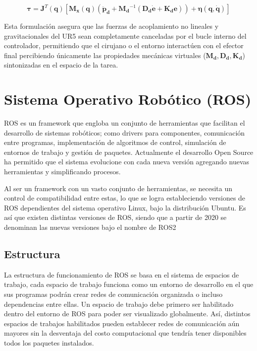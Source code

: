 \begin{equation}
    \boldsymbol{\tau} = \boldsymbol{J}^T(\boldsymbol{q}) \left[ \boldsymbol{M_x}(\boldsymbol{q}) \left( \boldsymbol{\ddot{p}_d} + \boldsymbol{M_d}^{-1} (\boldsymbol{D_d} \boldsymbol{\dot{e}} + \boldsymbol{K_d}
    \boldsymbol{e}) \right) + \boldsymbol{\eta}(\boldsymbol{q}, \boldsymbol{\dot{q}}) \right]
\end{equation}

Esta formulación asegura que las fuerzas de acoplamiento no lineales y
gravitacionales del UR5 sean completamente canceladas por el bucle interno del
controlador, permitiendo que el cirujano o el entorno interactúen con el
efector final percibiendo únicamente las propiedades mecánicas virtuales
($\boldsymbol{M_d}, \boldsymbol{D_d}, \boldsymbol{K_d}$) sintonizadas en el espacio de la tarea.

\section{Sistema Operativo Robótico (ROS)}

ROS es un framework que engloba un conjunto de herramientas que facilitan el
desarrollo de sistemas robóticos; como drivers para componentes, comunicación
entre programas, implementación de algoritmos de control, simulación de
entornos de trabajo y gestión de paquetes. Actualmente el desarrollo Open
Source ha permitido que el sistema evolucione con cada nueva versión agregando
nuevas herramientas y simplificando procesos.

Al ser un framework con un vasto conjunto de herramientas, se necesita un
control de compatibilidad entre estas, lo que se logra estableciendo versiones
de ROS dependientes del sistema operativo Linux, bajo la distribución Ubuntu.
Es así que existen distintas versiones de ROS, siendo que a partir de 2020 se
denominan las nuevas versiones bajo el nombre de ROS2
\cite{doi:10.1126/scirobotics.abm6074}\cite{doi:10.48550/arXiv.2305.09933}

\subsection{Estructura}
La estructura de funcionamiento de ROS se basa en el sistema de espacios de
trabajo, cada espacio de trabajo funciona como un entorno de desarrollo en el
que sus programas podrán crear redes de comunicación organizada o incluso
dependencias entre ellas. Un espacio de trabajo debe primero ser habilitado
dentro del entorno de ROS para poder ser visualizado globalmente. Así,
distintos espacios de trabajos habilitados pueden establecer redes de
comunicación aún mayores sin la desventaja del costo computacional que tendría
tener disponibles todos los paquetes instalados.

